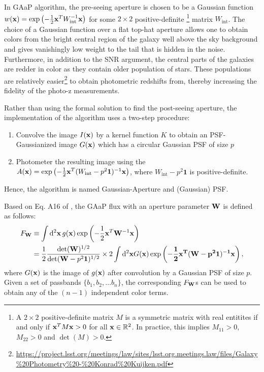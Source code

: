 \documentclass[DM,lsstdraft, authoryear,toc]{lsstdoc}
\newcommand{\rmd}{\mathrm{d}^2}
\begin{document}
In GAaP algorithm, the pre-seeing aperture is chosen to be a Gaussian function $w({\bf x}) = \exp\left(-\frac{1}{2}{\bf x}^T W_\text{int}^{-1}{\bf x}\right)$ for some $2\times 2$ positive-definite
\footnote{A $2\times 2$ positive-definite matrix $M$ is a symmetric matrix with real entitites if and only if ${\bf x}^T M {\bf x} > 0$ for all ${\bf x} \in \mathbb{R}^2$. In practice, this implies $M_{11} >0$, $M_{22}>0$ and $\det(M)>0$.}
matrix $W_\text{int}$.
The choice of a Gaussian function over a flat top-hat aperture allows one to obtain colors from the bright central region of the galaxy well above the sky background and gives vanishingly low weight to the tail that is hidden in the noise.
Furthermore, in addition to the SNR argument, the central parts of the galaxies are redder in color as they contain older population of stars.
These populations are relatively easier\footnote{\tiny\url{https://project.lsst.org/meetings/law/sites/lsst.org.meetings.law/files/Galaxy\%20Photometry\%20-\%20Konrad\%20Kuijken.pdf}} to obtain photometric redshifts from, thereby increasing the fidelity of the photo-z measurements.

Rather than using the formal solution to find the post-seeing aperture, the implementation of the algorithm uses a two-step procedure:
\begin{enumerate}
  \item Convolve the image $I({\bf x})$ by a kernel function $K$ to obtain an PSF-Gaussianized image $G({\bf x})$ which has a circular Gaussian PSF of size $p$
  \item Photometer the resulting image using the $A({\bf x}) = \exp\left(-\frac{1}{2}{\bf x}^T(W_\text{int}-p^2\mathbf{1})^{-1}{\bf x} \right)$, where $W_\text{int}-p^2\mathbf{1}$ is positive-definite.
\end{enumerate}

Hence, the algorithm is named Gaussian-Aperture and (Gaussian) PSF.

Based on Eq. A16 of \cite{Kuijken2015}, the GAaP flux with an aperture parameter ${\bf W}$ is defined as follows:
\begin{align}
  F_{\bf W} &\equiv \int\rmd{\bf x}\, g({\bf x})\exp\left( -\frac{1}{2}{\bf x}^T{\bf W}^{-1}{\bf x} \right) \\
        &= \frac{1}{2}\frac{\det({\bf W})^{1/2}}{\det({\bf W}-p^2{\bf 1})^{1/2}}\times 2\int\rmd{\bf x} G(\bf x) \exp\left(-\frac{1}{2}{\bf x}^T({\bf W}-p^2{\bf 1})^{-1}{\bf x}\right),
  \label{eq:A16}
\end{align}
where $G({\bf x})$ is the image of $g({\bf x})$ after convolution by a Gaussian PSF of size $p$.
Given a set of passbands $\{b_1, b_2, \dots b_n \}$, the corresponding $F_{\bf W}$s can be used to obtain any of the $(n-1)$ independent color terms.
\end{document}
